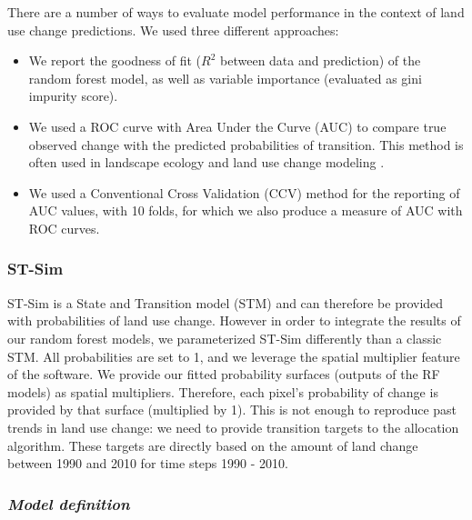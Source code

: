 There are a number of ways to evaluate model performance in the context of land use change predictions. We used three different approaches:
\begin{itemize}
\item We report the goodness of fit ($R^{2}$ between data and prediction) of the random forest model, as well as variable importance (evaluated as gini impurity score).
\item We used a ROC curve with Area Under the Curve (AUC) to compare true observed change with the predicted probabilities of transition. This method is often used in landscape ecology and land use change modeling \citep{pontius_recommendations_2014}.
\item We used a Conventional Cross Validation (CCV) method for the reporting of AUC values, with 10 folds, for which we also produce a measure of AUC with ROC curves.\\
\end{itemize}

\subsubsection*{ST-Sim}

ST-Sim \citep{daniel_state-and-transition_2016} is a State and Transition model (STM) and can therefore be provided with probabilities of land use change. However in order to integrate the results of our random forest models, we parameterized ST-Sim differently than a classic STM. All probabilities are set to 1, and we leverage the spatial multiplier feature of the software. We provide our fitted probability surfaces (outputs of the RF models) as spatial multipliers. Therefore, each pixel's probability of change is provided by that surface (multiplied by 1). This is not enough to reproduce past trends in land use change: we need to provide transition targets to the allocation algorithm. These targets are directly based on the amount of land change between 1990 and 2010 for time steps 1990 - 2010.\\

\subsubsection*{\textit{Model definition}}

